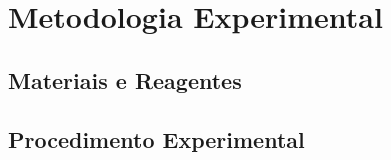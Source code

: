 \chapter{Metodologia Experimental}

\section{Materiais e Reagentes}\label{sec:Materiais e Reagentes} %
\section{Procedimento Experimental}\label{sec:Procedimento Experimental} %


